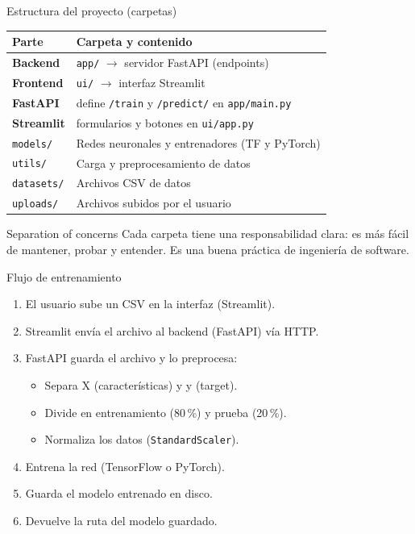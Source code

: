\documentclass[10pt,aspectratio=169]{beamer}
\begin{document}
\begin{frame}{Estructura del proyecto (carpetas)}
  \begin{center}
    \begin{tabular}{ll}
      \toprule
      \textbf{Parte} & \textbf{Carpeta y contenido} \\
      \midrule
      \textbf{Backend} & \texttt{app/} $\rightarrow$ servidor FastAPI (endpoints) \\
      \textbf{Frontend} & \texttt{ui/} $\rightarrow$ interfaz Streamlit \\
      \textbf{FastAPI} & define \texttt{/train} y \texttt{/predict/} en \texttt{app/main.py} \\
      \textbf{Streamlit} & formularios y botones en \texttt{ui/app.py} \\
      \texttt{models/} & Redes neuronales y entrenadores (TF y PyTorch) \\
      \texttt{utils/} & Carga y preprocesamiento de datos \\
      \texttt{datasets/} & Archivos CSV de datos \\
      \texttt{uploads/} & Archivos subidos por el usuario \\
      \bottomrule
    \end{tabular}
  \end{center}

  \pause
  \begin{block}{Separation of concerns}
    Cada carpeta tiene una responsabilidad clara: es más fácil de mantener,
    probar y entender. Es una buena práctica de ingeniería de software.
  \end{block}
\end{frame}

\begin{frame}{Flujo de entrenamiento}
  \begin{enumerate}
    \item El usuario sube un CSV en la interfaz (Streamlit).
    \item Streamlit envía el archivo al backend (FastAPI) vía HTTP.
    \item FastAPI guarda el archivo y lo preprocesa:
      \begin{itemize}
        \item Separa X (características) y y (target).
        \item Divide en entrenamiento (80\,\%) y prueba (20\,\%).
        \item Normaliza los datos (\texttt{StandardScaler}).
      \end{itemize}
    \item Entrena la red (TensorFlow o PyTorch).
    \item Guarda el modelo entrenado en disco.
    \item Devuelve la ruta del modelo guardado.
  \end{enumerate}
\end{frame}
\end{document}

